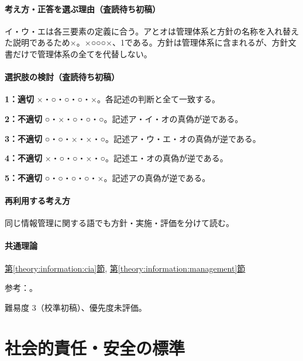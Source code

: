 \paragraph{考え方・正答を選ぶ理由（査読待ち初稿）} イ・ウ・エは各三要素の定義に合う。アとオは管理体系と方針の名称を入れ替えた説明であるため×。×○○○×、1である。方針は管理体系に含まれるが、方針文書だけで管理体系の全てを代替しない。

\paragraph{選択肢の検討（査読待ち初稿）}\mbox{}\par

\noindent\textbf{1：適切} ×・○・○・○・×。各記述の判断と全て一致する。\par

\noindent\textbf{2：不適切} ○・×・○・○・○。記述ア・イ・オの真偽が逆である。\par

\noindent\textbf{3：不適切} ○・○・×・×・○。記述ア・ウ・エ・オの真偽が逆である。\par

\noindent\textbf{4：不適切} ×・○・○・×・○。記述エ・オの真偽が逆である。\par

\noindent\textbf{5：不適切} ○・○・○・○・×。記述アの真偽が逆である。\par

\paragraph{再利用する考え方} 同じ情報管理に関する語でも方針・実施・評価を分けて読む。

\paragraph{共通理論} \hyperref[theory:information:cia]{第\ref*{theory:information:cia}節}, \hyperref[theory:information:management]{第\ref*{theory:information:management}節}

\par 参考：\cite{iso27000_2009}。

\par 難易度 3（校準初稿）、優先度未評価。

\section{社会的責任・安全の標準}

